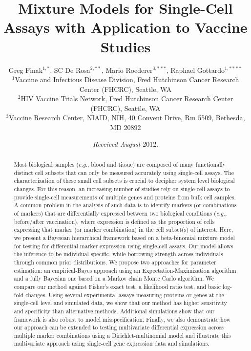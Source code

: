\documentclass[useAMS,referee,usenatbib]{biom}
\title[MIMOSA: Mixture Models or Single-Cell Assays]{Mixture Models for Single-Cell Assays with Application to Vaccine Studies}
\author{Greg Finak$^{1,*}$\email{gfinak@fhcrc.org},
SC De Rosa$^{2,**}$\email{sderosa@fhcrc.org},
Mario Roederer$^{3,***}$\email{marior@mail.nih.gov},
Raphael Gottardo$^{1,****}$\email{rgotard@fhcrc.org}\\
$^{1}$Vaccine and Infectious Disease Division, Fred Hutchinson Cancer Research Center (FHCRC), Seattle, WA\\
$^{2}$HIV Vaccine Trials Network, Fred Hutchinson Cancer Research Center (FHCRC), Seattle, WA\\
$^{3}$Vaccine Research Center, NIAID, NIH, 40 Convent Drive, Rm 5509, Bethesda, MD 20892}
\begin{document}
\date{{\it Received August} 2012.}

\pagerange{\pageref{firstpage}-\pageref{lastpage}} 
\volume{ }
\pubyear{ }
\artmonth{ }


\label{firstpage}

\begin{abstract}
Most biological samples (\textit{e.g.}, blood and tissue) are composed of many functionally distinct cell subsets that can only be measured accurately using single-cell assays. The characterization of these small cell subsets is crucial to decipher system level biological changes. For this reason, an increasing number of studies rely on single-cell assays to provide single-cell measurements of multiple genes and proteins from bulk cell samples. A common problem in the analysis of such data is to identify markers (or combinations of markers) that are differentially expressed between two biological conditions (\textit{e.g.}, before/after vaccination), where expression is defined as the proportion of cells expressing that marker (or marker combination) in the cell subset(s) of interest.
Here, we present a Bayesian hierarchical framework based on a beta-binomial mixture model for testing for differential marker expression using single-cell assays. Our model allows the inference to be individual specific, while borrowing strength across individuals through common prior distributions. We propose two approaches for parameter estimation: an empirical-Bayes approach using an Expectation-Maximization algorithm and a fully Bayesian one based on a Markov chain Monte Carlo algorithm. We compare our method against Fisher's exact test, a likelihood ratio test, and basic log-fold changes. Using several experimental assays measuring proteins or genes at the single-cell level and simulated data, we show that our method has higher sensitivity and specificity than alternative methods. Additional simulations show that our framework is also robust to model misspecification. Finally, we also demonstrate how our approach can be extended to testing multivariate differential expression across multiple marker combinations using a Dirichlet-multinomial model and illustrate this multivariate approach using single-cell gene expression data and simulations.
\end{abstract}
\end{document}
